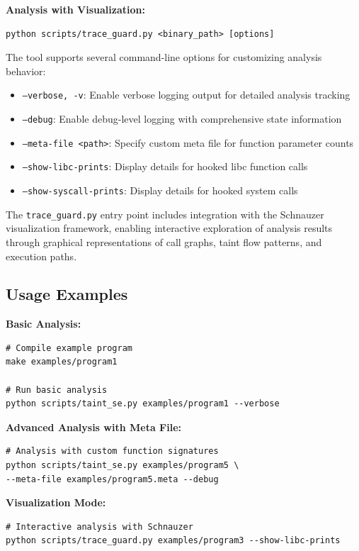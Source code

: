 \textbf{Analysis with Visualization:}
\begin{verbatim}
python scripts/trace_guard.py <binary_path> [options]
\end{verbatim}

The tool supports several command-line options for customizing analysis behavior:

\begin{itemize}
    \item \texttt{--verbose, -v}: Enable verbose logging output for detailed analysis tracking
    \item \texttt{--debug}: Enable debug-level logging with comprehensive state information
    \item \texttt{--meta-file <path>}: Specify custom meta file for function parameter counts
    \item \texttt{--show-libc-prints}: Display details for hooked libc function calls
    \item \texttt{--show-syscall-prints}: Display details for hooked system calls
\end{itemize}

The \texttt{trace\_guard.py} entry point includes integration with the Schnauzer visualization framework, enabling interactive exploration of analysis results through graphical representations of call graphs, taint flow patterns, and execution paths.

\pagebreak

\subsection{Usage Examples}

\textbf{Basic Analysis:}
\begin{verbatim}
# Compile example program
make examples/program1

# Run basic analysis
python scripts/taint_se.py examples/program1 --verbose
\end{verbatim}

\textbf{Advanced Analysis with Meta File:}
\begin{verbatim}
# Analysis with custom function signatures
python scripts/taint_se.py examples/program5 \
--meta-file examples/program5.meta --debug
\end{verbatim}

\textbf{Visualization Mode:}
\begin{verbatim}
# Interactive analysis with Schnauzer
python scripts/trace_guard.py examples/program3 --show-libc-prints
\end{verbatim}

